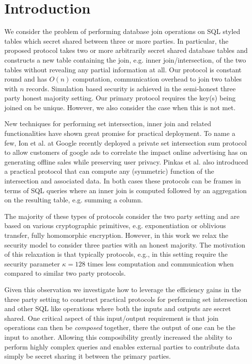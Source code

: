 \section{Introduction}

We consider the problem of performing database join operations on SQL styled tables which secret shared between three or more parties. In particular, the proposed protocol takes two or more arbitrarily  secret shared database tables and constructs a new table containing the join, e.g. inner join/intersection, of the two tables without revealing any partial information at all. Our protocol is constant round and  has $O(n)$ computation, communication  overhead to join two tables with $n$ records. Simulation based security is achieved in the semi-honest three party honest majority setting. Our primary protocol requires the key(s) being joined on be unique. However, we also consider the case when this is not met.

New techniques for performing set intersection, inner join and related functionalities have shown great promise for practical deployment. To name a few, Ion et al. at Google recently deployed a private set intersection sum protocol\cite{cryptoeprint:2017:738} to allow customers of google ads to correlate the impact online advertising has on generating offline sales while preserving user privacy. Pinkas et al. \cite{PSWW18} also introduced a practical protocol that can compute any (symmetric) function of the intersection and associated data. In both cases these protocols can be frames in terms of SQL queries where an inner join is computed followed by an aggregation on the resulting table, e.g. summing a column.  

The majority of these types of protocols consider the two party setting and are based on various cryptographic primitives, e.g. exponentiation\cite{cryptoeprint:2017:738} or oblivious transfer\cite{PSWW18}, fully homomorphic encryption\cite{CLR17}. However, in this work we relax the security model to consider three parties with an honest majority. The motivation of this relaxation is that typically protocols, e.g.\cite{highthroughput}, in this setting require the security parameter $\kappa=128$ times less computation and communication when compared to similar two party protocols.

Given this observation we investigate how to leverage the efficiency gains in the three party setting to construct practical protocols for performing set intersection and other SQL like operations where both the inputs and outputs are secret shared. One critical aspect of this input/output requirement is that join operations can then be \emph{composed} together, there the output of one can be the input to another. Allowing this composibility greatly increased the ability to perform highly complex queries and enables external parties to contribute data simply be secret sharing it between the primary parties.

